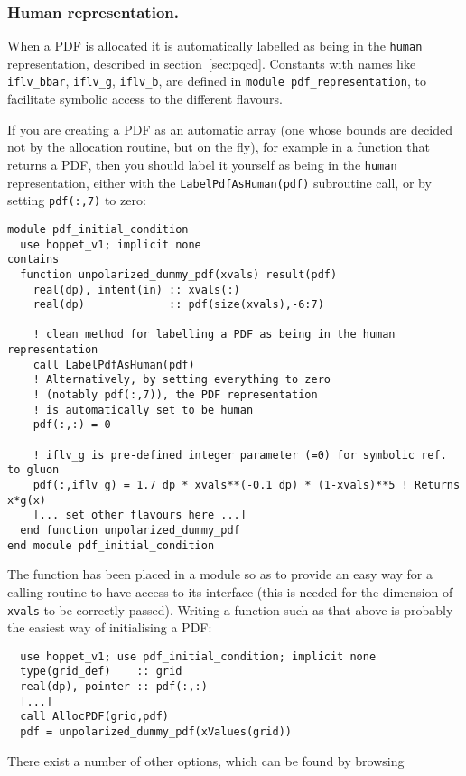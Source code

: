 \documentclass[12pt]{article}
\newcommand{\ttt}[1]{\texttt{#1}}
\begin{document}
\subsubsection{Human representation.}
\label{sec:human-rep}
When a PDF is allocated it is automatically labelled as being in the
\ttt{human} representation, described in
section~\ref{sec:pqcd}. Constants with names like
\ttt{iflv\_bbar}, \ttt{iflv\_g}, \ttt{iflv\_b}, are defined in
\ttt{module pdf\_representation}, to facilitate symbolic access to the
different flavours.

If you are creating a PDF as an automatic array (one whose bounds are
decided not by the allocation routine, but on the fly), for example in
a function that returns a PDF, then you should label it yourself as
being in the \ttt{human} representation, either with the
\ttt{LabelPdfAsHuman(pdf)} subroutine call, or by setting
\ttt{pdf(:,7)} to zero:
\begin{lstlisting}
module pdf_initial_condition
  use hoppet_v1; implicit none
contains
  function unpolarized_dummy_pdf(xvals) result(pdf)
    real(dp), intent(in) :: xvals(:)
    real(dp)             :: pdf(size(xvals),-6:7)

    ! clean method for labelling a PDF as being in the human representation
    call LabelPdfAsHuman(pdf)
    ! Alternatively, by setting everything to zero 
    ! (notably pdf(:,7)), the PDF representation
    ! is automatically set to be human
    pdf(:,:) = 0
    
    ! iflv_g is pre-defined integer parameter (=0) for symbolic ref. to gluon
    pdf(:,iflv_g) = 1.7_dp * xvals**(-0.1_dp) * (1-xvals)**5 ! Returns x*g(x)
    [... set other flavours here ...]
  end function unpolarized_dummy_pdf
end module pdf_initial_condition
\end{lstlisting}
The function has been placed in a module so as to provide an easy way
for a calling routine to have access to its interface (this is needed
for the dimension of \ttt{xvals} to be correctly passed).  Writing a
function such as that above is probably the easiest way of
initialising a PDF:
\begin{lstlisting}
  use hoppet_v1; use pdf_initial_condition; implicit none
  type(grid_def)    :: grid
  real(dp), pointer :: pdf(:,:)
  [...]
  call AllocPDF(grid,pdf)
  pdf = unpolarized_dummy_pdf(xValues(grid))
\end{lstlisting}
There exist a number of other options, which can be found by browsing
\end{document}
